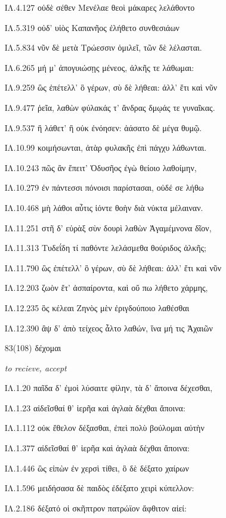 \begin{enumerate}
{ΙΛ.4.127 οὐδὲ σέθεν Μενέλαε θεοὶ μάκαρες λελάθοντο 

ΙΛ.5.319 οὐδ' υἱὸς Καπανῆος ἐλήθετο συνθεσιάων 

ΙΛ.5.834 νῦν δὲ μετὰ Τρώεσσιν ὁμιλεῖ, τῶν δὲ λέλασται. 

ΙΛ.6.265 μή μ' ἀπογυιώσῃς μένεος, ἀλκῆς τε λάθωμαι: 

ΙΛ.9.259 ὣς ἐπέτελλ' ὃ γέρων, σὺ δὲ λήθεαι: ἀλλ' ἔτι καὶ νῦν 

ΙΛ.9.477 ῥεῖα, λαθὼν φύλακάς τ' ἄνδρας δμῳάς τε γυναῖκας. 

ΙΛ.9.537 ἢ λάθετ' ἢ οὐκ ἐνόησεν: ἀάσατο δὲ μέγα θυμῷ. 

ΙΛ.10.99 κοιμήσωνται, ἀτὰρ φυλακῆς ἐπὶ πάγχυ λάθωνται. 

ΙΛ.10.243 πῶς ἂν ἔπειτ' Ὀδυσῆος ἐγὼ θείοιο λαθοίμην, 

ΙΛ.10.279 ἐν πάντεσσι πόνοισι παρίστασαι, οὐδέ σε λήθω 

ΙΛ.10.468 μὴ λάθοι αὖτις ἰόντε θοὴν διὰ νύκτα μέλαιναν. 

ΙΛ.11.251 στῆ δ' εὐρὰξ σὺν δουρὶ λαθὼν Ἀγαμέμνονα δῖον, 

ΙΛ.11.313 Τυδεΐδη τί παθόντε λελάσμεθα θούριδος ἀλκῆς; 

ΙΛ.11.790 ὣς ἐπέτελλ' ὃ γέρων, σὺ δὲ λήθεαι: ἀλλ' ἔτι καὶ νῦν 

ΙΛ.12.203 ζωὸν ἔτ' ἀσπαίροντα, καὶ οὔ πω λήθετο χάρμης, 

ΙΛ.12.235 ὃς κέλεαι Ζηνὸς μὲν ἐριγδούποιο λαθέσθαι 

ΙΛ.12.390 ἂψ δ' ἀπὸ τείχεος ἆλτο λαθών, ἵνα μή τις Ἀχαιῶν 

}

\clearpage
\item[\large 83(108)]{\large \g δέχομαι}

\hspace{0.2cm} \textit{ to recieve, accept}

{\g
ΙΛ.1.20 παῖδα δ' ἐμοὶ λύσαιτε φίλην, τὰ δ' ἄποινα δέχεσθαι, 

ΙΛ.1.23 αἰδεῖσθαί θ' ἱερῆα καὶ ἀγλαὰ δέχθαι ἄποινα: 

ΙΛ.1.112 οὐκ ἔθελον δέξασθαι, ἐπεὶ πολὺ βούλομαι αὐτὴν 

ΙΛ.1.377 αἰδεῖσθαί θ' ἱερῆα καὶ ἀγλαὰ δέχθαι ἄποινα: 

ΙΛ.1.446 ὣς εἰπὼν ἐν χερσὶ τίθει, ὃ δὲ δέξατο χαίρων 

ΙΛ.1.596 μειδήσασα δὲ παιδὸς ἐδέξατο χειρὶ κύπελλον: 

ΙΛ.2.186 δέξατό οἱ σκῆπτρον πατρώϊον ἄφθιτον αἰεί: 

}
\end{enumerate}
